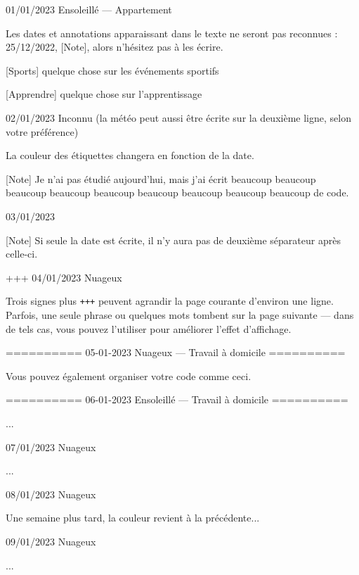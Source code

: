 \documentclass[11pt, paperstyle=light yellow, color entry, day-month-year]{jwjournal}
\begin{document}
01/01/2023 Ensoleillé --- Appartement

  Les dates et annotations apparaissant dans le texte ne seront pas reconnues : 25/12/2022, [Note], alors n'hésitez pas à les écrire.

  [Sports] quelque chose sur les événements sportifs

  [Apprendre] quelque chose sur l'apprentissage



02/01/2023
Inconnu (la météo peut aussi être écrite sur la deuxième ligne, selon votre préférence)

  La couleur des étiquettes changera en fonction de la date.

  [Note] Je n'ai pas étudié aujourd'hui, mais j'ai écrit beaucoup beaucoup beaucoup beaucoup beaucoup beaucoup beaucoup beaucoup beaucoup de code.



03/01/2023

  [Note] Si seule la date est écrite, il n'y aura pas de deuxième séparateur après celle-ci.


+++
04/01/2023  Nuageux

  Trois signes plus \texttt{+++} peuvent agrandir la page courante d'environ une ligne. Parfois, une seule phrase ou quelques mots tombent sur la page suivante --- dans de tels cas, vous pouvez l'utiliser pour améliorer l'effet d'affichage.



==========
05-01-2023    Nuageux       --- Travail à domicile
==========

Vous pouvez également organiser votre code comme ceci.


==========
06-01-2023    Ensoleillé    --- Travail à domicile
==========

...



07/01/2023  Nuageux

  ...



08/01/2023  Nuageux

  Une semaine plus tard, la couleur revient à la précédente...



09/01/2023  Nuageux

  ...
\end{document}
